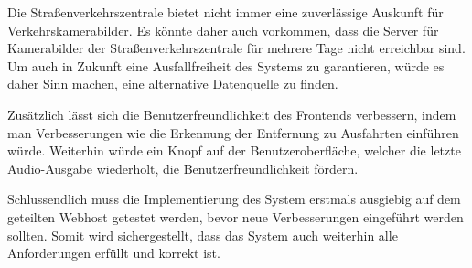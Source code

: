 Die Straßenverkehrszentrale bietet nicht immer eine zuverlässige Auskunft für Verkehrskamerabilder.
Es könnte daher auch vorkommen, dass die Server für Kamerabilder der Straßenverkehrszentrale für mehrere Tage nicht erreichbar sind.
Um auch in Zukunft eine Ausfallfreiheit des Systems zu garantieren, würde es daher Sinn machen, eine alternative Datenquelle zu finden.

Zusätzlich lässt sich die Benutzerfreundlichkeit des Frontends verbessern, indem man Verbesserungen wie die Erkennung der Entfernung zu Ausfahrten einführen würde.
Weiterhin würde ein Knopf auf der Benutzeroberfläche, welcher die letzte Audio-Ausgabe wiederholt, die Benutzerfreundlichkeit fördern.

Schlussendlich muss die Implementierung des System erstmals ausgiebig auf dem geteilten Webhost getestet werden, bevor neue Verbesserungen eingeführt werden sollten.
Somit wird sichergestellt, dass das System auch weiterhin alle Anforderungen erfüllt und korrekt ist.